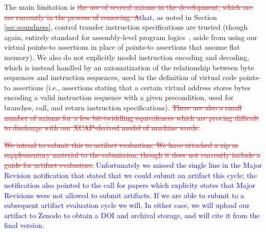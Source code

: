 \documentclass[acmsmall,screen,nonacm,review,anonymous]{acmart}
\newcommand{\add}[1]{\textcolor{blue}{#1}}
\newcommand{\del}[1]{\textcolor{red}{\st{#1}}}
\newcommand{\replace}[2]{\del{#1}\add{#2}}
\newcommand{\add}[1]{\textcolor{blue}{#1}}
\newcommand{\del}[1]{}
\newcommand{\replace}[2]{\del{#1}\add{#2}}
\begin{document}
The main limitation is \replace{the use of several axioms in the development, which are are currently
in the process of removing. A}{that, a}s noted in Section \ref{sec:soundness}, control transfer instruction
specifications are trusted (though again, entirely standard for assembly-level program logics~\cite{ni2007contexts,Ni2006codeptrs},
aside from using our virtual points-to assertions in place of points-to assertions that assume flat memory).
We also do not explicitly model instruction
encoding and decoding, which is instead handled by an axiomatization of the relationship between
byte sequences and instruction sequences, used in the definition of virtual code points-to
assertions (i.e., assertions stating that a certain virtual address stores bytes
encoding a valid instruction sequence with a given precondition, used for branches, call, and return instruction
specifications). 
\del{There are also a small number of axioms for a few bit-twiddling equivalences which are proving difficult to discharge
with our XCAP-derived model of machine words.}

\replace{We intend to submit this to artifact evaluation.
We have attached a zip as supplementary material to the submission, though it does not
currently include
a guide for artifact evaluators.}{
  Unfortunately we missed the single line in the Major Revision notification that stated 
  that we could submit an artifact this cycle; the notification also pointed to the call for papers
  which explicity states that Major Revisions were not allowed to submit artifacts.
  If we are able to submit to a subsequent artifact evaluation cycle we will.
  In either case, we will upload our artifact to Zenodo to obtain a DOI and archival storage,
  and will cite it from the final version.
}
\end{document}
